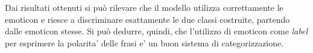 \documentclass[a4paper,12pt,openright,twoside]{report}
\theoremstyle{definition}
\begin{document}
Dai risultati ottenuti si può rilevare che il modello utilizza correttamente le emoticon e 
riesce a discriminare
esattamente le due classi costruite, partendo dalle emoticon stesse. 
Si può dedurre, quindi, che l'utilizzo
di emoticon come \emph{label} per esprimere la polarita' delle frasi e' un buon sistema di categorizzazione.
\end{document}
